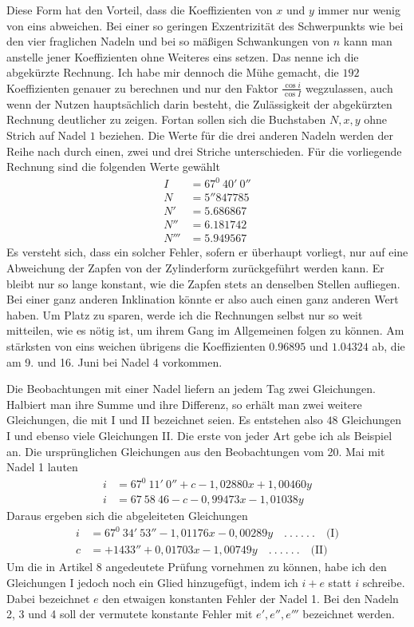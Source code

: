 Diese Form hat den Vorteil, dass die Koeffizienten von $x$ und $y$ immer nur wenig von eins abweichen. Bei einer so geringen Exzentrizität des Schwerpunkts wie bei den vier fraglichen Nadeln und bei so mäßigen Schwankungen von $n$ kann man anstelle jener Koeffizienten ohne Weiteres eins setzen. Das nenne ich die abgekürzte Rechnung. Ich habe mir dennoch die Mühe gemacht, die $192$ Koeffizienten genauer zu berechnen und nur den Faktor $\frac{\cos i}{\cos I}$ wegzulassen, auch wenn der Nutzen hauptsächlich darin besteht, die Zulässigkeit der abgekürzten Rechnung deutlicher zu zeigen. Fortan sollen sich die Buchstaben $N,x,y$ ohne Strich auf Nadel $1$ beziehen. Die Werte für die drei anderen Nadeln werden der Reihe nach durch einen, zwei und drei Striche unterschieden. Für die vorliegende Rechnung sind die folgenden Werte gewählt
\[
\begin{aligned}
I&=67^0\ 40'\ 0''\\
N&=5''847785\\
N'&=5.686867\\
N''&=6.181742\\
N'''&=5.949567
\end{aligned}
\]
\expandafter\def\csname HistoricalNoteText485\endcsname{Es versteht sich, dass ein solcher Fehler, sofern er überhaupt vorliegt, nur auf eine Abweichung der Zapfen von der Zylinderform zurückgeführt werden kann. Er bleibt nur so lange konstant, wie die Zapfen stets an denselben Stellen aufliegen. Bei einer ganz anderen Inklination könnte er also auch einen ganz anderen Wert haben.}
Um Platz zu sparen, werde ich die Rechnungen selbst nur so weit mitteilen, wie es nötig ist, um ihrem Gang im Allgemeinen folgen zu können. Am stärksten von eins weichen übrigens die Koeffizienten $0.96895$ und $1.04324$ ab, die am 9. und 16. Juni bei Nadel 4 vorkommen.

Die Beobachtungen mit einer Nadel liefern an jedem Tag zwei Gleichungen. Halbiert man ihre Summe und ihre Differenz, so erhält man zwei weitere Gleichungen, die mit I und II bezeichnet seien. Es entstehen also $48$ Gleichungen I und ebenso viele Gleichungen II. Die erste von jeder Art gebe ich als Beispiel an. Die ursprünglichen Gleichungen aus den Beobachtungen vom 20. Mai mit Nadel 1 lauten
\[
\begin{aligned}
i&=67^0\ 11'\ 0''+c-1{,}02880x+1{,}00460y\\
i&=67\ 58\ 46-c-0{,}99473x-1{,}01038y
\end{aligned}
\]
Daraus ergeben sich die abgeleiteten Gleichungen
\[
\begin{aligned}
i&=67^0\ 34'\ 53''-1{,}01176x-0{,}00289y\quad.\ .\ .\ .\ .\ .\quad\text{(I)}\\
c&=+1433''+0{,}01703x-1{,}00749y\quad.\ .\ .\ .\ .\ .\quad\text{(II)}
\end{aligned}
\]
Um die in Artikel 8 angedeutete Prüfung vornehmen zu können, habe ich den Gleichungen I jedoch noch ein Glied hinzugefügt, indem ich $i+e$ statt $i$ schreibe. Dabei bezeichnet $e$ den etwaigen konstanten Fehler der Nadel 1. Bei den Nadeln 2, 3 und 4 soll der vermutete konstante Fehler mit $e',e'',e'''$ bezeichnet werden.

